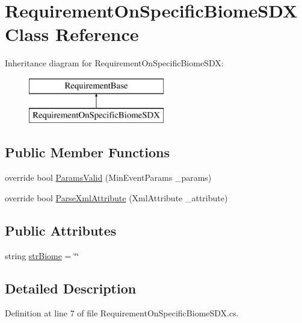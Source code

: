 \hypertarget{class_requirement_on_specific_biome_s_d_x}{}\section{Requirement\+On\+Specific\+Biome\+S\+DX Class Reference}
\label{class_requirement_on_specific_biome_s_d_x}
Inheritance diagram for Requirement\+On\+Specific\+Biome\+S\+DX\+:\begin{figure}[H]
\begin{center}
\leavevmode
\includegraphics[height=2.000000cm]{class_requirement_on_specific_biome_s_d_x}
\end{center}
\end{figure}
\subsection*{Public Member Functions}
\begin{DoxyCompactItemize}
\item 
override bool \mbox{\hyperlink{class_requirement_on_specific_biome_s_d_x_aacda5204187f23ca80df26561e3c6f40}{Params\+Valid}} (Min\+Event\+Params \+\_\+params)
\item 
override bool \mbox{\hyperlink{class_requirement_on_specific_biome_s_d_x_a2bfc37359c11f9108f2a3e9c4be34727}{Parse\+Xml\+Attribute}} (Xml\+Attribute \+\_\+attribute)
\end{DoxyCompactItemize}
\subsection*{Public Attributes}
\begin{DoxyCompactItemize}
\item 
string \mbox{\hyperlink{class_requirement_on_specific_biome_s_d_x_aa3d98e5bf06732fa8a5be22a27da898a}{str\+Biome}} = \char`\"{}\char`\"{}
\end{DoxyCompactItemize}


\subsection{Detailed Description}


Definition at line 7 of file Requirement\+On\+Specific\+Biome\+S\+D\+X.\+cs.



